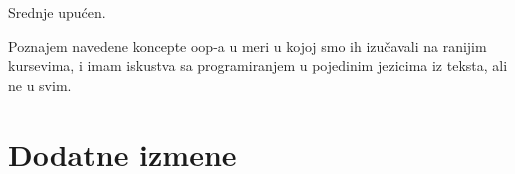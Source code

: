 \documentclass[a4paper]{report}
\begin{document}
Srednje upu\'cen.

Poznajem navedene koncepte oop-a u meri u kojoj smo ih izu\v cavali na ranijim kursevima, i imam iskustva sa programiranjem u pojedinim jezicima iz teksta, ali ne u svim.


\chapter{Dodatne izmene}
\end{document}
